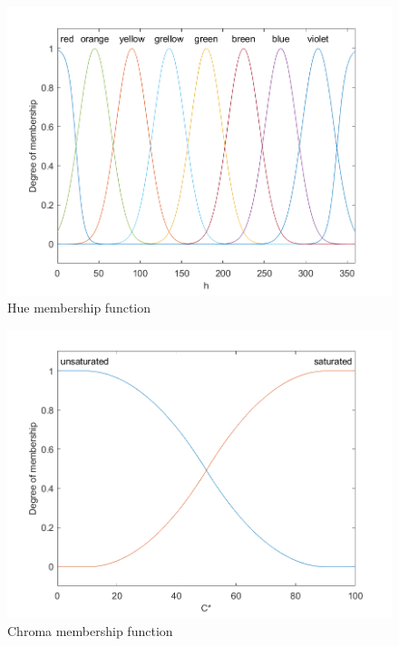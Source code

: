 \documentclass[twocolumn,a4paper]{article}
\begin{document}
\begin{figure}
	\centering
	\includegraphics[scale=0.5]{images/mf_h.png}
	\caption{Hue membership function}
	\label{fig:mfh}
\end{figure}
\begin{figure}
	\centering
	\includegraphics[scale=0.5]{images/mf_c.png}
	\caption{Chroma membership function}
	\label{fig:mfc}
\end{figure}
\end{document}
